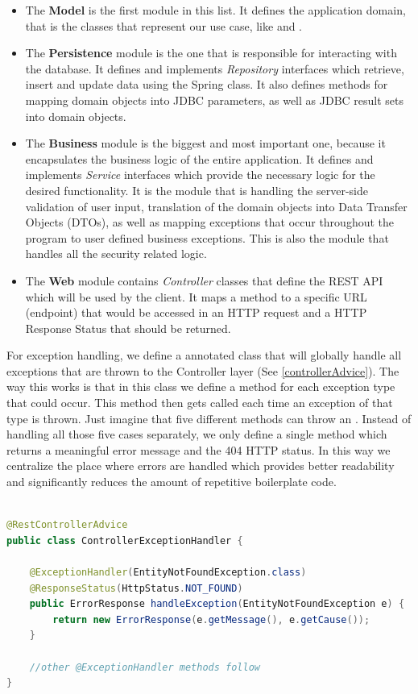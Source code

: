 \begin{itemize}
    \item The \textbf{Model} is the first module in this list. It defines the application domain, that is the classes that represent our use case, like  and .
    \item The \textbf{Persistence} module is the one that is responsible for interacting with the database. It defines and implements \textit{Repository} interfaces which retrieve, insert and update data using the Spring  class. It also defines methods for mapping domain objects into JDBC parameters, as well as JDBC result sets into domain objects.
    \item The \textbf{Business} module is the biggest and most important one, because it encapsulates the business logic of the entire application. It defines and implements \textit{Service} interfaces which provide the necessary logic for the desired functionality. It is the module that is handling the server-side validation of user input, translation of the domain objects into Data Transfer Objects (DTOs), as well as mapping exceptions that occur throughout the program to user defined business exceptions. This is also the module that handles all the security related logic.
    \item The \textbf{Web} module contains \textit{Controller} classes that define the REST API which will be used by the client. It maps a method to a specific URL (endpoint) that would be accessed in an HTTP request and a HTTP Response Status that should be returned.
\end{itemize}

For exception handling, we define a  annotated class that will globally handle all exceptions that are thrown to the Controller layer (See \ref{controllerAdvice}). The way this works is that in this class we define a method for each exception type that could occur. This method then gets called each time an exception of that type is thrown. Just imagine that five different methods can throw an . Instead of handling all those five cases separately, we only define a single method which returns a meaningful error message and the 404 HTTP status. In this way we centralize the place where errors are handled which provides better readability and significantly reduces the amount of repetitive boilerplate code.

\begin{lstlisting}[language=Java, caption={Simplified example of global exception handling class}, label={controllerAdvice}]

@RestControllerAdvice
public class ControllerExceptionHandler {

    @ExceptionHandler(EntityNotFoundException.class)
    @ResponseStatus(HttpStatus.NOT_FOUND)
    public ErrorResponse handleException(EntityNotFoundException e) {
        return new ErrorResponse(e.getMessage(), e.getCause());
    }

    //other @ExceptionHandler methods follow
}

\end{lstlisting}

